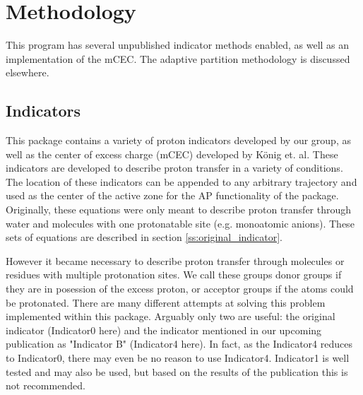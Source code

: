 \documentclass{article}
\begin{document}
\section{Methodology}
This program has several unpublished indicator methods enabled, as well as an implementation of the mCEC. The adaptive partition methodology is discussed elsewhere.

\subsection{Indicators}
This package contains a variety of proton indicators developed by our group, as well as the center of excess charge (mCEC) developed by K\"onig et. al.
These indicators are developed to describe proton transfer in a variety of conditions.
The location of these indicators can be appended to any arbitrary trajectory and used as the center of the active zone for the AP functionality of the package.
Originally, these equations were only meant to describe proton transfer through water and molecules with one protonatable site (e.g. monoatomic anions).
These sets of equations are described in section \ref{ss:original_indicator}.

However it became necessary to describe proton transfer through molecules or residues with multiple protonation sites.
We call these groups donor groups if they are in posession of the excess proton, or acceptor groups if the atoms could be protonated. 
There are many different attempts at solving this problem implemented within this package.
Arguably only two are useful: the original indicator (Indicator0 here) and the indicator mentioned in our upcoming publication as "Indicator B" (Indicator4 here).
In fact, as the Indicator4 reduces to Indicator0, there may even be no reason to use Indicator4.
Indicator1 is well tested and may also be used, but based on the results of the publication this is not recommended.
\end{document}
